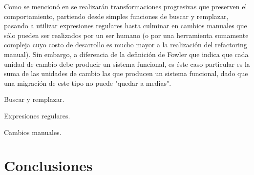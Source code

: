 \documentclass{article}
\begin{document}
Como se mencionó en  se realizarán transformaciones progresivas
que preserven el comportamiento, partiendo desde simples funciones de buscar y remplazar, pasando a
utilizar expresiones regulares hasta culminar en cambios manuales que sólo pueden ser realizados
por un ser humano (o por una herramienta sumamente compleja cuyo costo de desarrollo es mucho mayor
a la realización del refactoring manual). Sin embargo, a diferencia de la definición de Fowler que 
indica que cada unidad de cambio debe producir un sistema funcional, es éste caso particular es la suma
de las unidades de cambio las que producen un sistema funcional, dado que una migración de este tipo
no puede "quedar a medias".

\begin{compactitem}
\item Buscar y remplazar.
\item Expresiones regulares.
\item Cambios manuales.
\end{compactitem}

\addtocounter{footnote}{-1}


\hypertarget{conclusiones}{}
\section{Conclusiones}
\end{document}
